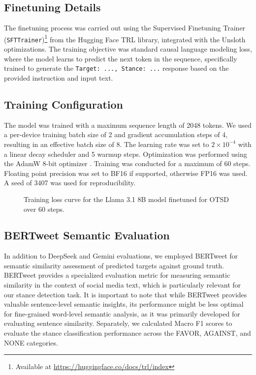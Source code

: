 \documentclass[twocolumn,11pt,letterpaper]{article}
\begin{document}
\subsection{Finetuning Details}
\label{sec:finetuning}

The finetuning process was carried out using the Supervised Finetuning Trainer (\texttt{SFTTrainer})\footnote{Available at \url{https://huggingface.co/docs/trl/index}} from the Hugging Face TRL library, integrated with the Unsloth optimizations. The training objective was standard causal language modeling loss, where the model learns to predict the next token in the sequence, specifically trained to generate the \texttt{Target: ..., Stance: ...} response based on the provided instruction and input text.

\subsection{Training Configuration}
The model was trained with a maximum sequence length of 2048 tokens. We used a per-device training batch size of 2 and gradient accumulation steps of 4, resulting in an effective batch size of 8. The learning rate was set to $2 \times 10^{-4}$ with a linear decay scheduler and 5 warmup steps. Optimization was performed using the AdamW 8-bit optimizer \cite{adamw8bit}. Training was conducted for a maximum of 60 steps. Floating point precision was set to BF16 if supported, otherwise FP16 was used. A seed of 3407 was used for reproducibility.

\begin{figure}[htbp]
\centering

\caption{Training loss curve for the Llama 3.1 8B model finetuned for OTSD over 60 steps.}
\label{fig:training_loss}
\end{figure}

\subsection{BERTweet Semantic Evaluation}
In addition to DeepSeek and Gemini evaluations, we employed BERTweet \cite{bertweet} for semantic similarity assessment of predicted targets against ground truth. BERTweet provides a specialized evaluation metric for measuring semantic similarity in the context of social media text, which is particularly relevant for our stance detection task. It is important to note that while BERTweet provides valuable sentence-level semantic insights, its performance might be less optimal for fine-grained word-level semantic analysis, as it was primarily developed for evaluating sentence similarity. Separately, we calculated Macro F1 scores to evaluate the stance classification performance across the FAVOR, AGAINST, and NONE categories.
\end{document}
